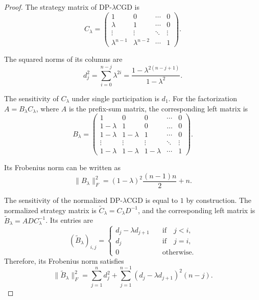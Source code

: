 \documentclass{article}
\theoremstyle{plain}
\theoremstyle{definition}
\theoremstyle{remark}
\newcommand{\method}{DP-$\lambda$CGD\xspace}
\begin{document}
\begin{proof}
The strategy matrix of \method is
\begin{equation}
    C_{\lambda} = \begin{pmatrix}
        1 & 0 & \cdots &0\\
        \lambda & 1 & \cdots & 0\\
        \vdots & \vdots & \ddots & \vdots\\
        \lambda^{n - 1} & \lambda^{n - 2} & \cdots & 1
    \end{pmatrix}.
\end{equation}

The squared norms of its columns are
\begin{equation}
    d_j^2 = \sum\limits_{i = 0}^{n - j} \lambda^{2i}
    = \frac{1 - \lambda^{2(n - j + 1)}}{1 -\lambda^2}. 
\end{equation}

The sensitivity of $C_{\lambda}$ under single participation is $d_1$.
For the factorization $A = B_{\lambda} C_{\lambda}$, where $A$ is the prefix-sum matrix, the corresponding left matrix is
\begin{equation}
    B_{\lambda} = \begin{pmatrix}
        1 & 0 & 0 & \cdots & 0\\
        1- \lambda & 1 & 0 & \dots &0\\
        1 - \lambda & 1- \lambda & 1 &\cdots & 0\\
        \vdots & \vdots & \vdots & \ddots & \vdots\\
        1 - \lambda & 1- \lambda & 1 - \lambda & \cdots & 1
    \end{pmatrix}.
\end{equation}

Its Frobenius norm can be written as
\begin{equation}
    \|B_{\lambda}\|_{F}^2 = (1 - \lambda)^2 \frac{(n - 1)n}{2} + n.
\end{equation}

The sensitivity of the normalized \method is equal to $1$ by construction.
The normalized strategy matrix is $\tilde{C}_{\lambda} = C_{\lambda} D^{-1}$, and the corresponding left matrix is
$\tilde{B}_{\lambda} = A D C_{\lambda}^{-1}$.
Its entries are
\begin{equation}
    (\tilde{B}_{\lambda})_{i,j} = \begin{cases}
        d_{j} - \lambda d_{j + 1} \quad & \text{if} \quad j < i,\\
        d_j \quad &\text{if} \quad j = i,\\
        0 \quad &\text{otherwise.}
    \end{cases}
\end{equation}
Therefore, its Frobenius norm satisfies
\begin{equation}
    \|\tilde{B}_{\lambda}\|_F^2
    = \sum\limits_{j = 1}^{n} d_j^2
    + \sum\limits_{j = 1}^{n - 1} (d_j - \lambda d_{j + 1})^2 (n - j).
\end{equation}


\end{proof}
\end{document}
